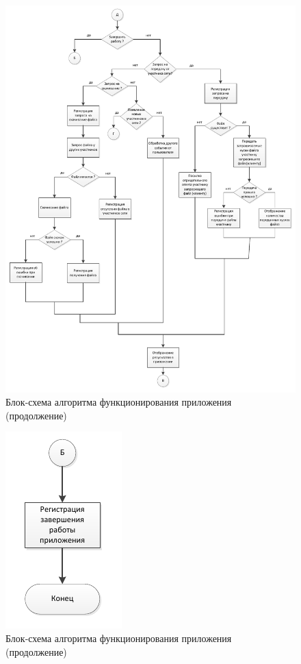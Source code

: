\begin{figure}[!p]
    \centering
    \includegraphics[scale=0.8]{pic_7}
    \caption{Блок-схема алгоритма функционирования приложения (продолжение)}\label{pic_7}
\end{figure}

\newpage
\begin{figure}[t!]
    \centering
    \includegraphics[scale=0.8]{pic_8}
    \caption{Блок-схема алгоритма функционирования приложения (продолжение)}\label{pic_8}
\end{figure}

